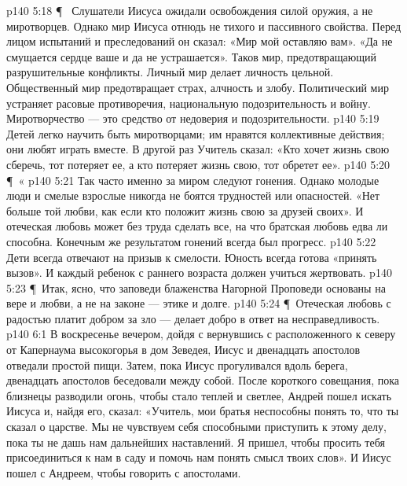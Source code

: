 \vs p140 5:18 \P\ \bibnobreakspace {} Слушатели Иисуса ожидали освобождения силой оружия, а не миротворцев. Однако мир Иисуса отнюдь не тихого и пассивного свойства. Перед лицом испытаний и преследований он сказал: «Мир мой оставляю вам». «Да не смущается сердце ваше и да не устрашается». Таков мир, предотвращающий разрушительные конфликты. Личный мир делает личность цельной. Общественный мир предотвращает страх, алчность и злобу. Политический мир устраняет расовые противоречия, национальную подозрительность и войну. Миротворчество --- это средство от недоверия и подозрительности.
\vs p140 5:19 Детей легко научить быть миротворцами; им нравятся коллективные действия; они любят играть вместе. В другой раз Учитель сказал: «Кто хочет жизнь свою сберечь, тот потеряет ее, а кто потеряет жизнь свою, тот обретет ее».
\vs p140 5:20 \P\ \bibnobreakspace «
\vs p140 5:21 Так часто именно за миром следуют гонения. Однако молодые люди и смелые взрослые никогда не боятся трудностей или опасностей. «Нет больше той любви, как если кто положит жизнь свою за друзей своих». И отеческая любовь может без труда сделать все, на что братская любовь едва ли способна. Конечным же результатом гонений всегда был прогресс.
\vs p140 5:22 Дети всегда отвечают на призыв к смелости. Юность всегда готова «принять вызов». И каждый ребенок с раннего возраста должен учиться жертвовать.
\vs p140 5:23 \P\ Итак, ясно, что заповеди блаженства Нагорной Проповеди основаны на вере и любви, а не на законе --- этике и долге.
\vs p140 5:24 \P\ Отеческая любовь с радостью платит добром за зло --- делает добро в ответ на несправедливость.
\vs p140 6:1 В воскресенье вечером, дойдя с вернувшись с расположенного к северу от Капернаума высокогорья в дом Зеведея, Иисус и двенадцать апостолов отведали простой пищи. Затем, пока Иисус прогуливался вдоль берега, двенадцать апостолов беседовали между собой. После короткого совещания, пока близнецы разводили огонь, чтобы стало теплей и светлее, Андрей пошел искать Иисуса и, найдя его, сказал: «Учитель, мои братья неспособны понять то, что ты сказал о царстве. Мы не чувствуем себя способными приступить к этому делу, пока ты не дашь нам дальнейших наставлений. Я пришел, чтобы просить тебя присоединиться к нам в саду и помочь нам понять смысл твоих слов». И Иисус пошел с Андреем, чтобы говорить с апостолами.
